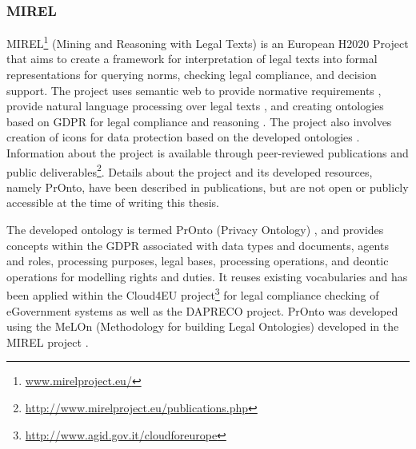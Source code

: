 \subsubsection{MIREL}\label{sec:sota:MIREL}
MIREL\footnote{\url{www.mirelproject.eu/}} (Mining and Reasoning with Legal Texts) is an European H2020 Project that aims to create a framework for interpretation of legal texts into formal representations for querying norms, checking legal compliance, and decision support. The project uses semantic web to provide normative requirements \cite{gandon_normative_2017}, provide natural language processing over legal texts \cite{teruel_legal_2018}, and creating ontologies based on GDPR \cite{monica_legal_2018} for legal compliance \cite{palmirani_pronto_2018-1} and reasoning \cite{palmirani_pronto_2018}. The project also involves creation of icons for data protection based on the developed ontologies \cite{arianna_dapis_2019}.
Information about the project is available through peer-reviewed publications and public deliverables\footnote{\url{http://www.mirelproject.eu/publications.php}}.
Details about the project and its developed resources, namely PrOnto, have  been described in publications, but are not open or publicly accessible at the time of writing this thesis.

The developed ontology is termed PrOnto (Privacy Ontology) \cite{monica_legal_2018}, and provides concepts within the GDPR associated with data types and documents, agents and roles, processing purposes, legal bases, processing operations, and deontic operations for modelling rights and duties. It reuses existing vocabularies \cite{palmirani_pronto_2018} and has been applied within the Cloud4EU project\footnote{\url{http://www.agid.gov.it/cloudforeurope}} for legal compliance checking of eGovernment systems as well as the DAPRECO project.
PrOnto was developed using the MeLOn (Methodology for building Legal Ontologies) developed in the MIREL project \cite{palmirani_pronto_2018,palmirani_pronto_2018-1,monica_modelling_2018}.

